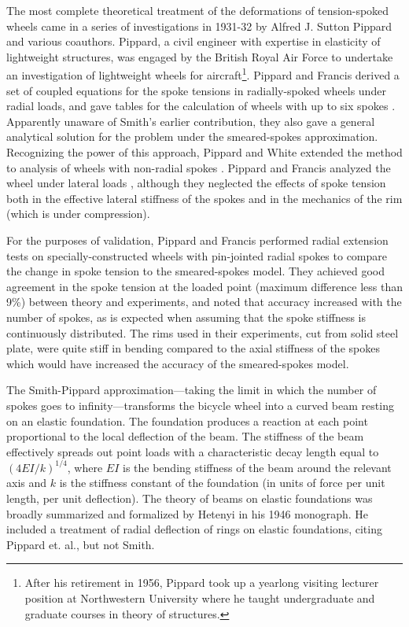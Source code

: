 \documentclass[../thesis.tex]{subfiles}
\begin{document}
The most complete theoretical treatment of the deformations of tension-spoked wheels came in a series of investigations in 1931-32 by Alfred J. Sutton Pippard and various coauthors. Pippard, a civil engineer with expertise in elasticity of lightweight structures, was engaged by the British Royal Air Force to undertake an investigation of lightweight wheels for aircraft\footnote{After his retirement in 1956, Pippard took up a yearlong visiting lecturer position at Northwestern University where he taught undergraduate and graduate courses in theory of structures.}. Pippard and Francis derived a set of coupled equations for the spoke tensions in radially-spoked wheels under radial loads, and gave tables for the calculation of wheels with up to six spokes \cite{Pippard1931}. Apparently unaware of Smith's earlier contribution, they also gave a general analytical solution for the problem under the smeared-spokes approximation. Recognizing the power of this approach, Pippard and White extended the method to analysis of wheels with non-radial spokes \cite{Pippard1932b}. Pippard and Francis analyzed the wheel under lateral loads \cite{Pippard1932a}, although they neglected the effects of spoke tension both in the effective lateral stiffness of the spokes and in the mechanics of the rim (which is under compression).

For the purposes of validation, Pippard and Francis performed radial extension tests on specially-constructed wheels with pin-jointed radial spokes to compare the change in spoke tension to the smeared-spokes model. They achieved good agreement in the spoke tension at the loaded point (maximum difference less than 9\%) between theory and experiments, and noted that accuracy increased with the number of spokes, as is expected when assuming that the spoke stiffness is continuously distributed. The rims used in their experiments, cut from solid steel plate, were quite stiff in bending compared to the axial stiffness of the spokes which would have increased the accuracy of the smeared-spokes model.

The Smith-Pippard approximation---taking the limit in which the number of spokes goes to infinity---transforms the bicycle wheel into a curved beam resting on an elastic foundation. The foundation produces a reaction at each point proportional to the local deflection of the beam. The stiffness of the beam effectively spreads out point loads with a characteristic decay length equal to $(4EI/k)^{1/4}$, where $EI$ is the bending stiffness of the beam around the relevant axis and $k$ is the stiffness constant of the foundation (in units of force per unit length, per unit deflection). The theory of beams on elastic foundations was broadly summarized and formalized by Hetenyi \cite{Hetenyi1946} in his 1946 monograph. He included a treatment of radial deflection of rings on elastic foundations, citing Pippard et. al., but not Smith.
\end{document}
